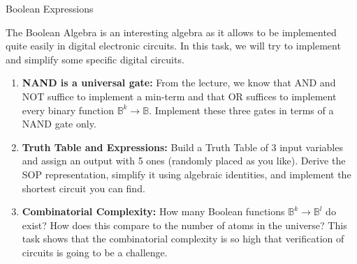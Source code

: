 \begin{task}{Boolean Expressions}{}{}

  The Boolean Algebra is an interesting algebra as it allows to be implemented quite easily in digital electronic circuits.
  In this task, we will try to implement and simplify some specific digital circuits.
    
  \begin{enumerate}
  \item{\textbf{NAND is a universal gate:} From the lecture, we know that AND and NOT suffice to implement a min-term and that OR suffices to implement every binary function $\mathbb{B}^k \rightarrow \mathbb{B}$. Implement these three gates in terms of a NAND gate only.}
  \item{\textbf{Truth Table and Expressions:} Build a Truth Table of 3 input variables and assign an output with 5 ones (randomly placed as you like). Derive the SOP representation, simplify it using algebraic identities, and implement the shortest circuit you can find.}
  \item{\textbf{Combinatorial Complexity:} How many Boolean functions $\mathbb{B}^k \rightarrow \mathbb{B}^l$ do exist?
    How does this compare to the number of atoms in the universe? This task shows that the combinatorial complexity
    is so high that verification of circuits is going to be a challenge. }
  \end{enumerate}
%
\end{task}
